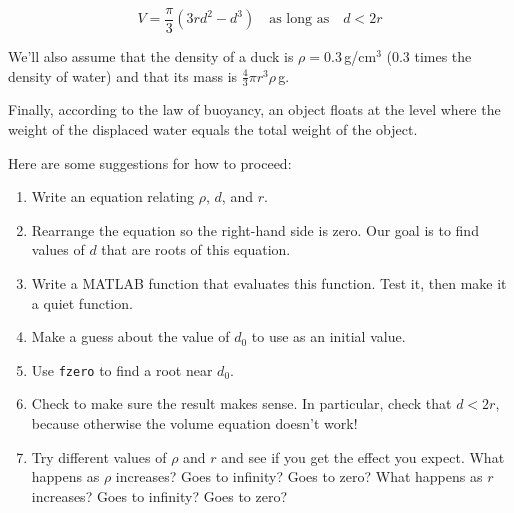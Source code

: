 \[ V = \frac{\pi}{3} (3r d^2 - d^3) \quad
\mbox{as long as} \quad d < 2 r  \]

We'll also assume that the density of a duck is $\rho = 0.3$\,g/cm$^3$ (0.3 times the density of water) and that its mass is $\frac{4}{3} \pi r^3 \rho$\,g.

Finally, according to the law of buoyancy, an object floats at the level where the weight of the displaced water equals the total weight of the object.


Here are some suggestions for how to proceed:

\begin{enumerate}

\item Write an equation relating $\rho$, $d$, and $r$.

\item Rearrange the equation so the right-hand side is zero.
Our goal is to find values of $d$ that are roots of this equation.

\item Write a MATLAB function that evaluates this function.  Test it,
   then make it a quiet function.

\item Make a guess about the value of $d_0$ to use as an initial value.

\item Use \lstinline{fzero} to find a root near $d_0$.

\item Check to make sure the result makes sense.  In particular,
   check that $d < 2 r$, because otherwise the volume equation
   doesn't work!

\item Try different values of $\rho$ and $r$ and see if you get the
  effect you expect.  What happens as $\rho$ increases?  Goes to
  infinity?  Goes to zero?  What happens as $r$ increases?  Goes to
  infinity?  Goes to zero?

\end{enumerate}




